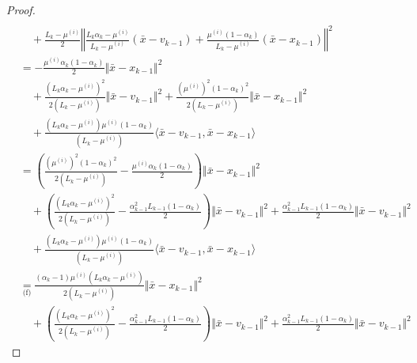 \documentclass[12pt]{article}
\begin{document}
\begin{proof}
{\begin{align*}
                    \\&\quad
                    + \frac{L_k - \mu^{(i)}}{2}
                    \left\Vert
                        \frac{L_k\alpha_k - \mu^{(i)}}{L_k - \mu^{(i)}}(\bar x - v_{k - 1})
                        + \frac{\mu^{(i)}(1 - \alpha_k)}{L_k - \mu^{(i)}}(\bar x - x_{k - 1})
                    \right\Vert^2
                \\
                &= 
                - \frac{\mu^{(i)}\alpha_k(1 - \alpha_k)}{2}\Vert \bar x - x_{k - 1}\Vert^2 
                    \\&\quad
                    + \frac{(L_k\alpha_k - \mu^{(i)})^2}{2(L_k - \mu^{(i)})} \Vert \bar x - v_{k - 1}\Vert^2
                    + \frac{(\mu^{(i)})^2(1 - \alpha_k)^2}{2(L_k - \mu^{(i)})}\Vert \bar x - x_{k - 1}\Vert^2 
                    \\&\quad 
                    + \frac{(L_k\alpha_k  - \mu^{(i)})\mu^{(i)}(1 - \alpha_k)}{(L_k - \mu^{(i)})}\langle \bar x - v_{k - 1}, \bar x - x_{k - 1}\rangle
                \\
                &= 
                \left(
                    \frac{(\mu^{(i)})^2(1 - \alpha_k)^2}{2(L_k - \mu^{(i)})} - \frac{\mu^{(i)}\alpha_k(1 - \alpha_k)}{2}
                \right)\Vert \bar x - x_{k - 1}\Vert^2
                    \\ &\quad 
                    + \left(
                        \frac{(L_k\alpha_k - \mu^{(i)})^2}{2(L_k - \mu^{(i)})} - \frac{\alpha_{k - 1}^2L_{k - 1}(1 - \alpha_k)}{2}
                    \right) \Vert \bar x - v_{k - 1}\Vert^2
                    + \frac{\alpha_{k - 1}^2L_{k - 1}(1 - \alpha_k)}{2} \Vert \bar x - v_{k - 1}\Vert^2
                    \\&\quad 
                    + \frac{(L_k\alpha_k  - \mu^{(i)})\mu^{(i)}(1 - \alpha_k)}{(L_k - \mu^{(i)})}\langle \bar x - v_{k - 1}, \bar x - x_{k - 1}\rangle
                \\
                &\underset{\text{(f)}}{=}
                \frac{(\alpha_k - 1)\mu^{(i)}\left(L_k\alpha_k - \mu^{(i)}\right)}
                {2\left(L_k - \mu^{(i)}\right)} \Vert \bar x - x_{k - 1}\Vert^2
                    \\ &\quad 
                    + \left(
                        \frac{(L_k\alpha_k - \mu^{(i)})^2}{2(L_k - \mu^{(i)})} - \frac{\alpha_{k - 1}^2L_{k - 1}(1 - \alpha_k)}{2}
                    \right) \Vert \bar x - v_{k - 1}\Vert^2
                    + \frac{\alpha_{k - 1}^2L_{k - 1}(1 - \alpha_k)}{2} \Vert \bar x - v_{k - 1}\Vert^2

\end{align*}}
\end{proof}
\end{document}
